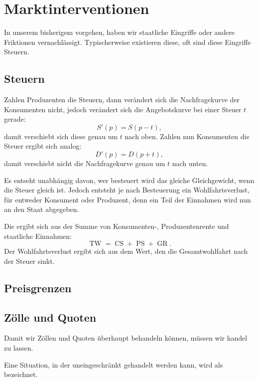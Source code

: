 \section{Marktinterventionen}



In unserem bisherigem vorgehen, haben wir staatliche Eingriffe oder andere Friktionen vernachlässigt.
Typischerweise existieren diese, oft sind diese Eingriffe Steuern.

\subsection{Steuern}

Zahlen Produzenten die Steuern, dann verändert sich die Nachfragekurve der Konsumenten nicht, jedoch verändert sich die Angebotskurve bei einer Steuer $t$ gerade:
\[
S'(p) = S(p-t)
,\]
damit verschiebt sich diese genau um $t$ nach oben. 
Zahlen nun Konsumenten die Steuer ergibt sich analog:
\[
D'(p) = D(p+t)
,\]
damit verschiebt nicht die Nachfragekurve genau um $t$ nach unten.

Es entseht unabhängig davon, wer besteuert wird das gleiche Gleichgewicht, wenn die Steuer gleich ist. Jedoch entsteht je nach Besteuerung ein Wohlfahrtsverlust, für entweder Konsument oder Produzent, denn ein Teil der Einnahmen wird nun an den Staat abgegeben.
\begin{definition}
    Die  ergibt sich aus der Summe von Konsumenten-, Produzentenrente und staatliche Einnahmen:
    \[
        \operatorname{TW} = \operatorname{CS} + \operatorname{PS} + \operatorname{GR}
    .\] 
    Der Wohlfahrtsverlust ergibt sich aus dem Wert, den die Gesamtwohlfahrt nach der Steuer sinkt. 
\end{definition}

\subsection{Preisgrenzen}





\subsection{Zölle und Quoten}

Damit wir Zöllen und Quoten überhaupt behandeln können, müssen wir handel zu lassen.


\begin{definition} 
	Eine Situation, in der uneingeschränkt gehandelt werden kann, wird als
	 bezeichnet.
\end{definition}

